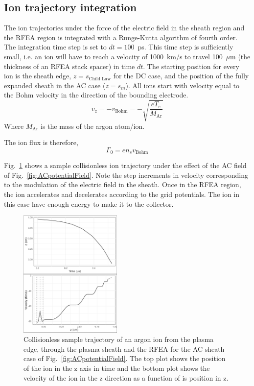 \subsection{\label{IonTrajectory}Ion trajectory integration}
The ion trajectories under the force of the electric field in the sheath region and the RFEA region is integrated with a Runge-Kutta algorithm of fourth order. The integration time step is set to $dt=100$~ps. This time step is sufficiently small, i.e. an ion will have to reach a velocity of 1000~km/s to travel 100~$\mu$m (the thickness of an RFEA stack spacer) in time $dt$. The starting position for every ion is the sheath edge, $z=s_\text{Child Law}$ for the DC case, and the position of the fully expanded sheath in the AC case ($z=s_m$). All ions start with velocity equal to the Bohm velocity in the direction of the bounding electrode.
\begin{equation}
v_z = - v_\text{Bohm} = -\sqrt{\frac{e T_e}{M_\text{Ar}}}
\end{equation}
Where $M_\text{Ar}$ is the mass of the argon atom/ion. 

The ion flux is therefore, 
\begin{equation}
\Gamma_0 = e n_s v_\text{Bohm} 
\end{equation}

Fig.~\ref{fig:CollisionlessACtrajectory} shows a sample collisionless ion trajectory under the effect of the AC field of Fig.~\ref{fig:ACpotentialField}. Note the step increments in velocity corresponding to the modulation of the electric field in the sheath. Once in the RFEA region, the ion accelerates and decelerates according to the grid potentials. The ion in this case have enough energy to make it to the collector. 

\begin{figure}[htbp]
\centering
\includegraphics[width=0.45\textwidth]{Figures/ionTrajectory0.5Pa13.56MHz2kVStack2332_Collisionless.jpeg}
\caption{Collisionless sample trajectory of an argon ion from the plasma edge, through the plasma sheath and the RFEA for the AC sheath case of Fig.~\ref{fig:ACpotentialField}. The top plot shows the position of the ion in the z axis in time and the bottom plot shows the velocity of the ion in the z direction as a function of is position in z. }
\label{fig:CollisionlessACtrajectory}
\end{figure}



